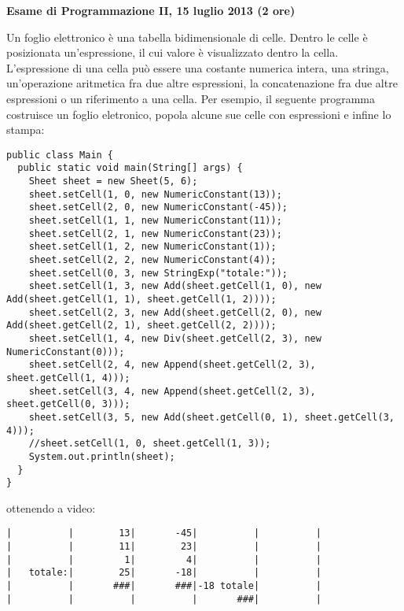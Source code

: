 \documentclass{article}[10pt]
\begin{document}
\begin{center} {\bf Esame di Programmazione II, 15 luglio 2013 (2 ore)}\end{center}

Un foglio elettronico \`e una tabella bidimensionale di celle. Dentro le celle \`e posizionata
un'espressione, il cui valore \`e visualizzato dentro la cella. L'espressione di
una cella pu\`o essere una costante numerica intera, una stringa, un'operazione aritmetica fra
due altre espressioni, la concatenazione fra due altre espressioni o un riferimento a una cella.
Per esempio, il seguente programma costruisce un foglio eletronico, popola alcune sue celle con
espressioni e infine lo stampa:

{\small
\begin{verbatim}
public class Main {
  public static void main(String[] args) {
    Sheet sheet = new Sheet(5, 6);
    sheet.setCell(1, 0, new NumericConstant(13));
    sheet.setCell(2, 0, new NumericConstant(-45));
    sheet.setCell(1, 1, new NumericConstant(11));
    sheet.setCell(2, 1, new NumericConstant(23));
    sheet.setCell(1, 2, new NumericConstant(1));
    sheet.setCell(2, 2, new NumericConstant(4));
    sheet.setCell(0, 3, new StringExp("totale:"));
    sheet.setCell(1, 3, new Add(sheet.getCell(1, 0), new Add(sheet.getCell(1, 1), sheet.getCell(1, 2))));
    sheet.setCell(2, 3, new Add(sheet.getCell(2, 0), new Add(sheet.getCell(2, 1), sheet.getCell(2, 2))));
    sheet.setCell(1, 4, new Div(sheet.getCell(2, 3), new NumericConstant(0)));
    sheet.setCell(2, 4, new Append(sheet.getCell(2, 3), sheet.getCell(1, 4)));
    sheet.setCell(3, 4, new Append(sheet.getCell(2, 3), sheet.getCell(0, 3)));
    sheet.setCell(3, 5, new Add(sheet.getCell(0, 1), sheet.getCell(3, 4)));
    //sheet.setCell(1, 0, sheet.getCell(1, 3));
    System.out.println(sheet);
  }
}
\end{verbatim}
}

\noindent
ottenendo a video:

{\scriptsize
\begin{verbatim}
|          |        13|       -45|          |          |
|          |        11|        23|          |          |
|          |         1|         4|          |          |
|   totale:|        25|       -18|          |          |
|          |       ###|       ###|-18 totale|          |
|          |          |          |       ###|          |
\end{verbatim}
}
\end{document}
